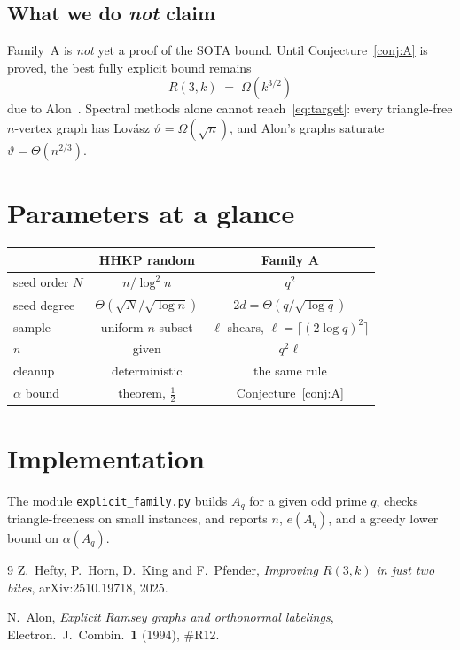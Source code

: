 \documentclass[11pt]{article}
\theoremstyle{definition}
\begin{document}
\subsection{What we do \emph{not} claim}

Family~A is \emph{not} yet a proof of the SOTA bound.
Until Conjecture~\ref{conj:A} is proved, the best fully explicit bound remains
\[
  R(3,k)\;=\;\Omega(k^{3/2})
\]
due to Alon~\cite{Alon1994}.
Spectral methods alone cannot reach~\eqref{eq:target}: every triangle-free $n$-vertex graph has Lov\'asz $\vartheta=\Omega(\sqrt{n})$, and Alon's graphs saturate $\vartheta=\Theta(n^{2/3})$.

\section{Parameters at a glance}

\begin{center}
\begin{tabular}{lcc}
\hline
 & HHKP random & Family A \\
\hline
seed order $N$ & $n/\log^{2}n$ & $q^{2}$ \\
seed degree & $\Theta(\sqrt{N}/\sqrt{\log n})$ & $2d=\Theta(q/\sqrt{\log q})$ \\
sample & uniform $n$-subset & $\ell$ shears, $\ell=\lceil(2\log q)^{2}\rceil$ \\
$n$ & given & $q^{2}\ell$ \\
cleanup & deterministic & the same rule \\
$\alpha$ bound & theorem, $\tfrac12$ & Conjecture~\ref{conj:A} \\
\hline
\end{tabular}
\end{center}

\section{Implementation}

The module \texttt{explicit\_family.py} builds $A_{q}$ for a given odd prime $q$, checks triangle-freeness on small instances, and reports $n$, $e(A_{q})$, and a greedy lower bound on $\alpha(A_{q})$.

\begin{thebibliography}{9}
Z.~Hefty, P.~Horn, D.~King and F.~Pfender,
\emph{Improving $R(3,k)$ in just two bites},
arXiv:2510.19718, 2025.

N.~Alon,
\emph{Explicit Ramsey graphs and orthonormal labelings},
Electron.\ J.\ Combin.\ \textbf{1} (1994), \#R12.
\end{thebibliography}
\end{document}
